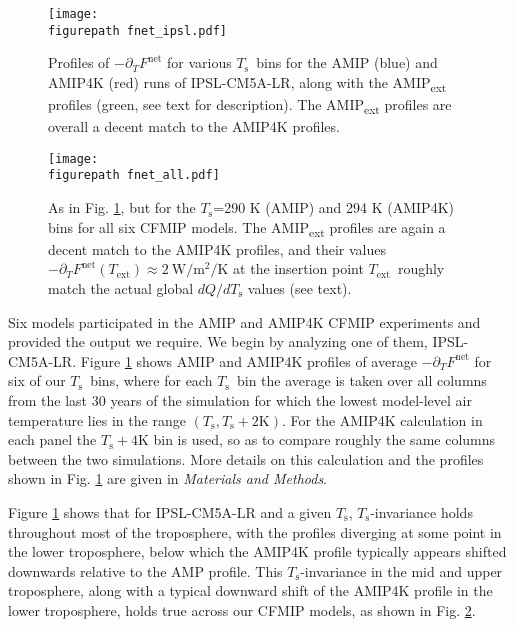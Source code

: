 \documentclass[9pt,twocolumn,twoside,lineno]{pnas-new}
\newcommand{\ppt}{\ensuremath{\partial_T}}
\newcommand{\Fnet}{\ensuremath{F^\mathrm{net}}}
\newcommand{\WmsqK}{\ensuremath{\mathrm{W/m^2/K}}}
\newcommand{\Kelvin}{\ensuremath{\mathrm{K}}}
\newcommand{\Ts}{\ensuremath{T_\mathrm{s}}}
\newcommand{\Tlcl}{\ensuremath{T_\mathrm{LCL}}}
\newcommand{\Text}{\ensuremath{T_\mathrm{ext}}}
\newcommand{\figurepath}{../../figures/}
\begin{document}
\begin{figure}[t]
	\begin{center}
			\texttt{[image: \\figurepath fnet\_ipsl.pdf]}
		\caption{ Profiles of $-\ppt \Fnet$ for various \Ts\ bins for the AMIP (blue) and AMIP4K (red) runs of IPSL-CM5A-LR, along with the AMIP\textsubscript{ext} profiles (green, see text for description). The AMIP\textsubscript{ext} profiles are overall a decent match to the AMIP4K profiles.
		\label{fnet_ipsl}
		}
	\end{center}
\end{figure}


\begin{figure}[t]
	\begin{center}
			\texttt{[image: \\figurepath fnet\_all.pdf]}
		\caption{ As in Fig. \ref{fnet_ipsl}, but for the \Ts=290 K (AMIP) and 294 K (AMIP4K) bins for all six CFMIP models. The AMIP\textsubscript{ext} profiles are again a decent match to the AMIP4K profiles, and their values $-\ppt\Fnet(\Text)\approx 2\ \WmsqK$ at the insertion point \Text\ roughly match the actual  global $dQ/d\Ts$  values (see text).
		\label{fnet_all}
		}
	\end{center}
\end{figure}

Six models participated in the AMIP and AMIP4K CFMIP experiments and provided the output we require. We begin by analyzing one of them, IPSL-CM5A-LR. Figure \ref{fnet_ipsl} shows AMIP and AMIP4K  profiles of average $-\ppt \Fnet$ for six of our \Ts\ bins, where for each \Ts\ bin the average is taken over  all columns from the last 30 years of the simulation for which the lowest model-level air temperature lies in the range $(\Ts,\Ts +2\Kelvin)$. For the AMIP4K calculation in each panel the $\Ts +4\Kelvin$ bin is used, so as to compare roughly the same columns between the two simulations. 
More details on this calculation and the profiles shown in Fig. \ref{fnet_ipsl} are given in \emph{Materials and Methods}.

 Figure \ref{fnet_ipsl} shows that for IPSL-CM5A-LR and a given \Ts, \Ts-invariance holds throughout most of the troposphere, 
 with the profiles diverging at some point in the lower troposphere, below which the AMIP4K profile typically appears shifted downwards relative to the AMP  profile. 
 This \Ts-invariance in the mid and upper troposphere, along with a typical downward shift of the AMIP4K profile in the lower troposphere, holds true across our CFMIP models, as shown in Fig. \ref{fnet_all}.
\end{document}
